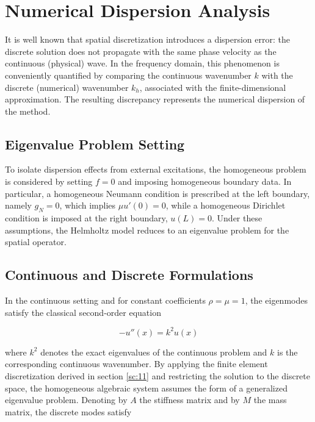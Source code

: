 
\section{Numerical Dispersion Analysis}
\label{sc:14}

It is well known that spatial discretization introduces a dispersion error: the discrete solution does not propagate with the same phase velocity as the continuous (physical) wave. In the frequency domain, this phenomenon is conveniently quantified by comparing the continuous wavenumber \(k\) with the discrete (numerical) wavenumber \(k_h\), associated with the finite-dimensional approximation. The resulting discrepancy represents the numerical dispersion of the method.

\subsection{Eigenvalue Problem Setting}

To isolate dispersion effects from external excitations, the homogeneous problem is considered by setting \(f = 0\) and imposing homogeneous boundary data. In particular, a homogeneous Neumann condition is prescribed at the left boundary, namely \(g_N = 0\), which implies \(\mu u'(0) = 0\), while a homogeneous Dirichlet condition is imposed at the right boundary, \(u(L) = 0\). Under these assumptions, the Helmholtz model reduces to an eigenvalue problem for the spatial operator.

\subsection{Continuous and Discrete Formulations}

In the continuous setting and for constant coefficients \(\rho = \mu = 1\), the eigenmodes satisfy the classical second-order equation

\begin{equation}
    -u''(x) = k^2 u(x)
    \label{eq:cont_eig}
\end{equation}

where \(k^2\) denotes the exact eigenvalues of the continuous problem and \(k\) is the corresponding continuous wavenumber. By applying the finite element discretization derived in section \ref{sc:11} and restricting the solution to the discrete space, the homogeneous algebraic system assumes the form of a generalized eigenvalue problem. Denoting by \(A\) the stiffness matrix and by \(M\) the mass matrix, the discrete modes satisfy

